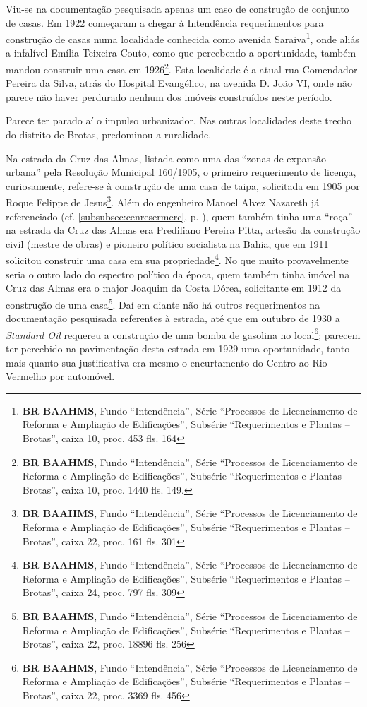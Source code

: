Viu-se na documentação pesquisada apenas um caso de construção de conjunto de casas. Em 1922 começaram a chegar à Intendência requerimentos para construção de casas numa localidade conhecida como avenida Saraiva\footnote{\textbf{BR BAAHMS}, Fundo ``Intendência'', Série ``Processos de Licenciamento de Reforma e Ampliação de Edificações'', Subsérie ``Requerimentos e Plantas -- Brotas'', caixa 10, proc. 453 fls. 164}, onde aliás a infalível Emília Teixeira Couto, como que percebendo a oportunidade, também mandou construir uma casa em 1926\footnote{\textbf{BR BAAHMS}, Fundo ``Intendência'', Série ``Processos de Licenciamento de Reforma e Ampliação de Edificações'', Subsérie ``Requerimentos e Plantas -- Brotas'', caixa 10, proc. 1440 fls. 149.}. Esta localidade é a atual rua Comendador Pereira da Silva, atrás do Hospital Evangélico, na avenida D. João VI, onde não parece não haver perdurado nenhum dos imóveis construídos neste período.


Parece ter parado aí o impulso urbanizador. Nas outras localidades deste trecho do distrito de Brotas, predominou a ruralidade.

Na estrada da Cruz das Almas, listada como uma das ``zonas de expansão urbana'' pela Resolução Municipal 160/1905, o primeiro requerimento de licença, curiosamente, refere-se à construção de uma casa de taipa, solicitada em 1905 por Roque Felippe de Jesus\footnote{\textbf{BR BAAHMS}, Fundo ``Intendência'', Série ``Processos de Licenciamento de Reforma e Ampliação de Edificações'', Subsérie ``Requerimentos e Plantas -- Brotas'', caixa 22, proc. 161 fls. 301}. Além do engenheiro Manoel Alvez Nazareth já referenciado (cf. \autoref{subsubsec:cenresermerc}, p. \pageref{subsubsec:cenresermerc}), quem também tinha uma ``roça'' na estrada da Cruz das Almas era Prediliano Pereira Pitta, artesão da construção civil (mestre de obras) e pioneiro político socialista na Bahia, que em 1911 solicitou construir uma casa em sua propriedade\footnote{\textbf{BR BAAHMS}, Fundo ``Intendência'', Série ``Processos de Licenciamento de Reforma e Ampliação de Edificações'', Subsérie ``Requerimentos e Plantas -- Brotas'', caixa 24, proc. 797 fls. 309}. No que muito provavelmente seria o outro lado do espectro político da época, quem também tinha imóvel na Cruz das Almas era o major Joaquim da Costa Dórea, solicitante em 1912 da construção de uma casa\footnote{\textbf{BR BAAHMS}, Fundo ``Intendência'', Série ``Processos de Licenciamento de Reforma e Ampliação de Edificações'', Subsérie ``Requerimentos e Plantas -- Brotas'', caixa 22, proc. 18896 fls. 256}. Daí em diante não há outros requerimentos na documentação pesquisada referentes à estrada, até que em outubro de 1930 a \textit{Standard Oil} requereu a construção de uma bomba de gasolina no local\footnote{\textbf{BR BAAHMS}, Fundo ``Intendência'', Série ``Processos de Licenciamento de Reforma e Ampliação de Edificações'', Subsérie ``Requerimentos e Plantas -- Brotas'', caixa 22, proc. 3369 fls. 456}; parecem ter percebido na pavimentação desta estrada em 1929 uma oportunidade, tanto mais quanto sua justificativa era mesmo o encurtamento do Centro ao Rio Vermelho por automóvel.

